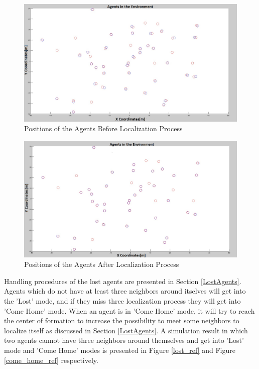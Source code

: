 \begin{figure}[H]
\centering
\captionsetup{format=hang,justification=centerfirst}
\caption{Positions of the Agents Before Localization Process} \label{hatali_pos_ref}
\centerline{
\includegraphics[scale = 0.35]{Pozisyon_1_Hatali}}
\label{fig:lps}
\end{figure}

\begin{figure}[H]
\centering
\captionsetup{format=hang,justification=centerfirst}
\caption{Positions of the Agents After Localization Process} \label{duzgun_pos_ref}
\centerline{\includegraphics[scale = 0.25]{Pozisyon-1-Duzeltilmis}}
\end{figure} 
		
Handling procedures of the lost agents are presented in Section \ref{LostAgents}. Agents which do not have at least three neighbors around itselves will get into the 'Lost' mode, and if  they miss three localization process they will get into 'Come Home' mode. When an agent is in 'Come Home' mode, it will try to reach the center of formation to increase the possibility to meet some neighbors to localize itself as discussed in Section \ref{LostAgents}. A simulation result in which two agents cannot have three neighbors around themselves and get into 'Lost' mode and 'Come Home' modes  is presented in Figure \ref{lost_ref} and Figure \ref{come_home_ref} respectively.
		
